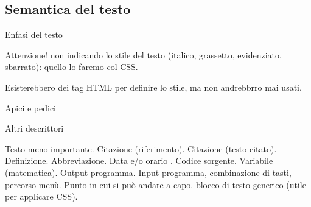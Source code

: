 \subsection[Testo]{Semantica del testo}

\begin{frame}[fragile]{Enfasi del testo}\transfade\centering

\pause\bigskip
\alert{Attenzione!} non indicando lo stile del testo (italico, grassetto, evidenziato, sbarrato): quello lo faremo col CSS.

\pause\medskip
Esisterebbero dei tag HTML per definire lo stile, ma non andrebbrro mai usati.


\end{frame}

\begin{frame}[fragile]{Apici e pedici}\transfade\centering
\end{frame}



\begin{frame}{Altri descrittori}\transfade\centering
  \begin{description}[<+->]
    \itemtt[small] Testo meno importante.
    \itemtt[cite] Citazione (riferimento).
    \itemtt[q] Citazione (testo citato).
    \itemtt[dfn] Definizione.
    \itemtt[abbr] Abbreviazione.
    \itemtt[time] Data e/o orario .
    \itemtt[codice] Codice sorgente.
    \itemtt[var] Variabile (matematica).
    \itemtt[samp] Output programma.
    \itemtt[kbd] Input programma, combinazione di tasti, percorso menù.
    \itemtt[wbr] Punto in cui si può andare a capo.
    \itemtt[span] blocco di testo generico (utile per applicare CSS).
  \end{description}
\end{frame}
